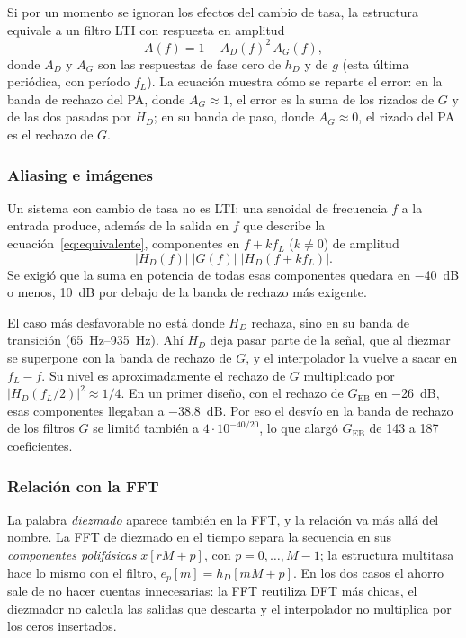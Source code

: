 \documentclass[11pt,a4paper]{article}
\begin{document}
Si por un momento se ignoran los efectos del cambio de tasa, la estructura
equivale a un filtro LTI con respuesta en amplitud
\begin{equation}
  A(f) = 1 - A_D(f)^2\, A_G(f),
  \label{eq:equivalente}
\end{equation}
donde $A_D$ y $A_G$ son las respuestas de fase cero de $h_D$ y de $g$ (esta
última periódica, con período $f_L$). La ecuación muestra cómo se reparte el
error: en la banda de rechazo del PA, donde $A_G \approx 1$, el error es la
suma de los rizados de $G$ y de las dos pasadas por $H_D$; en su banda de
paso, donde $A_G \approx 0$, el rizado del PA es el rechazo de $G$.

\subsubsection{Aliasing e imágenes}

Un sistema con cambio de tasa no es LTI: una senoidal de frecuencia $f$ a la
entrada produce, además de la salida en $f$ que describe la
ecuación~\eqref{eq:equivalente}, componentes en $f + k f_L$ ($k \ne 0$) de
amplitud
\begin{equation}
  |H_D(f)|\;|G(f)|\;|H_D(f + k f_L)|.
  \label{eq:espurias}
\end{equation}
Se exigió que la suma en potencia de todas esas componentes quedara en
\qty{-40}{\deci\bel} o menos, \qty{10}{\deci\bel} por debajo de la banda de
rechazo más exigente.

El caso más desfavorable no está donde $H_D$ rechaza, sino en su banda de
transición (\qtyrange{65}{935}{\hertz}). Ahí $H_D$ deja pasar parte de la
señal, que al diezmar se superpone con la banda de rechazo de $G$, y el
interpolador la vuelve a sacar en $f_L - f$. Su nivel es aproximadamente el
rechazo de $G$ multiplicado por $|H_D(f_L/2)|^2 \approx 1/4$. En un primer
diseño, con el rechazo de $G_{\text{EB}}$ en \qty{-26}{\deci\bel}, esas
componentes llegaban a \qty{-38.8}{\deci\bel}. Por eso el desvío en la banda
de rechazo de los filtros $G$ se limitó también a $4 \cdot 10^{-40/20}$, lo
que alargó $G_{\text{EB}}$ de 143 a 187 coeficientes.

\subsubsection{Relación con la FFT}\label{sec:fft}

La palabra \emph{diezmado} aparece también en la FFT, y la relación va más
allá del nombre. La FFT de diezmado en el tiempo separa la secuencia en sus
\emph{componentes polifásicas} $x[rM + p]$, con $p = 0, \dots, M-1$; la
estructura multitasa hace lo mismo con el filtro, $e_p[m] = h_D[mM + p]$. En
los dos casos el ahorro sale de no hacer cuentas innecesarias: la FFT
reutiliza DFT más chicas, el diezmador no calcula las salidas que descarta y
el interpolador no multiplica por los ceros insertados.
\end{document}
